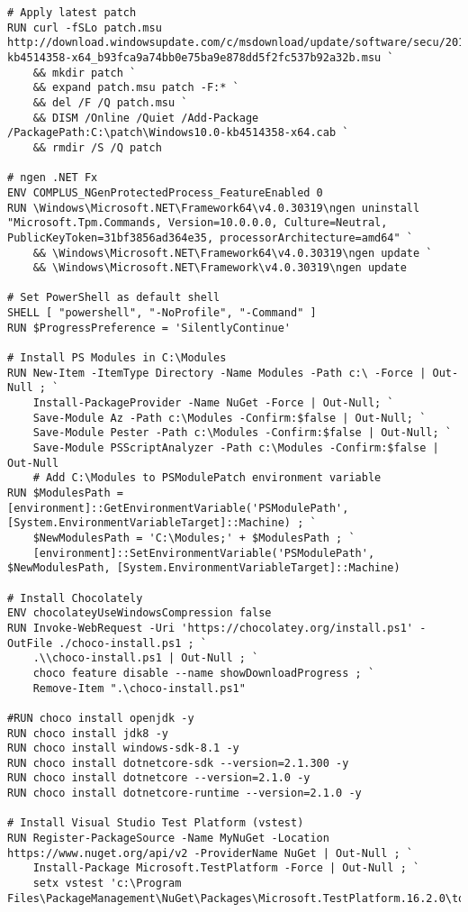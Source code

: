 \begin{lstlisting}[breaklines]
# Apply latest patch
RUN curl -fSLo patch.msu http://download.windowsupdate.com/c/msdownload/update/software/secu/2019/09/windows10.0-kb4514358-x64_b93fca9a74bb0e75ba9e878dd5f2fc537b92a32b.msu `
    && mkdir patch `
    && expand patch.msu patch -F:* `
    && del /F /Q patch.msu `
    && DISM /Online /Quiet /Add-Package /PackagePath:C:\patch\Windows10.0-kb4514358-x64.cab `
    && rmdir /S /Q patch

# ngen .NET Fx
ENV COMPLUS_NGenProtectedProcess_FeatureEnabled 0
RUN \Windows\Microsoft.NET\Framework64\v4.0.30319\ngen uninstall "Microsoft.Tpm.Commands, Version=10.0.0.0, Culture=Neutral, PublicKeyToken=31bf3856ad364e35, processorArchitecture=amd64" `
    && \Windows\Microsoft.NET\Framework64\v4.0.30319\ngen update `
    && \Windows\Microsoft.NET\Framework\v4.0.30319\ngen update

# Set PowerShell as default shell
SHELL [ "powershell", "-NoProfile", "-Command" ]
RUN $ProgressPreference = 'SilentlyContinue'

# Install PS Modules in C:\Modules
RUN New-Item -ItemType Directory -Name Modules -Path c:\ -Force | Out-Null ; `
    Install-PackageProvider -Name NuGet -Force | Out-Null; `
    Save-Module Az -Path c:\Modules -Confirm:$false | Out-Null; `
    Save-Module Pester -Path c:\Modules -Confirm:$false | Out-Null; `
    Save-Module PSScriptAnalyzer -Path c:\Modules -Confirm:$false | Out-Null
    # Add C:\Modules to PSModulePatch environment variable
RUN $ModulesPath = [environment]::GetEnvironmentVariable('PSModulePath', [System.EnvironmentVariableTarget]::Machine) ; `
    $NewModulesPath = 'C:\Modules;' + $ModulesPath ; `
    [environment]::SetEnvironmentVariable('PSModulePath', $NewModulesPath, [System.EnvironmentVariableTarget]::Machine)

# Install Chocolately
ENV chocolateyUseWindowsCompression false
RUN Invoke-WebRequest -Uri 'https://chocolatey.org/install.ps1' -OutFile ./choco-install.ps1 ; `
    .\\choco-install.ps1 | Out-Null ; `
    choco feature disable --name showDownloadProgress ; `
    Remove-Item ".\choco-install.ps1"

#RUN choco install openjdk -y
RUN choco install jdk8 -y
RUN choco install windows-sdk-8.1 -y
RUN choco install dotnetcore-sdk --version=2.1.300 -y
RUN choco install dotnetcore --version=2.1.0 -y
RUN choco install dotnetcore-runtime --version=2.1.0 -y

# Install Visual Studio Test Platform (vstest)
RUN Register-PackageSource -Name MyNuGet -Location https://www.nuget.org/api/v2 -ProviderName NuGet | Out-Null ; `
    Install-Package Microsoft.TestPlatform -Force | Out-Null ; `
    setx vstest 'c:\Program Files\PackageManagement\NuGet\Packages\Microsoft.TestPlatform.16.2.0\tools\net451\Common7\IDE\Extensions\TestPlatform'


\end{lstlisting}
